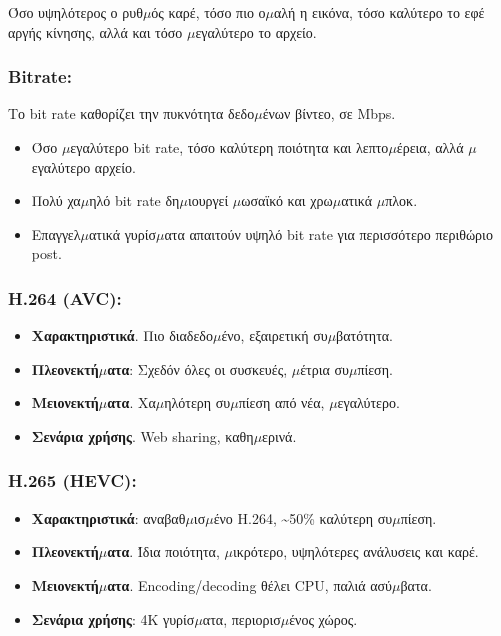 Όσο υψηλότερος ο ρυθ$\mu$ός καρέ, τόσο πιο ο$\mu$αλή η εικόνα, τόσο καλύτερο το εφέ αργής κίνησης, αλλά και τόσο $\mu$εγαλύτερο το αρχείο.

\subsubsection*{Bitrate:}

Το bit rate καθορίζει την πυκνότητα δεδο$\mu$ένων βίντεο, σε Mbps.

\begin{itemize}
  \item Όσο $\mu$εγαλύτερο bit rate, τόσο καλύτερη ποιότητα και λεπτο$\mu$έρεια, αλλά $\mu$εγαλύτερο αρχείο.
  \item Πολύ χα$\mu$ηλό bit rate δη$\mu$ιουργεί $\mu$ωσαϊκό και χρω$\mu$ατικά $\mu$πλοκ.
  \item Επαγγελ$\mu$ατικά γυρίσ$\mu$ατα απαιτούν υψηλό bit rate για περισσότερο περιθώριο post.
\end{itemize}


\subsubsection*{H.264 (AVC):}

\begin{itemize}
  \item \textbf{Χαρακτηριστικά}. Πιο διαδεδο$\mu$ένο, εξαιρετική συ$\mu$βατότητα.
  \item \textbf{Πλεονεκτή$\mu$ατα}: Σχεδόν όλες οι συσκευές, $\mu$έτρια συ$\mu$πίεση.
  \item \textbf{Μειονεκτή$\mu$ατα}. Χα$\mu$ηλότερη συ$\mu$πίεση από νέα, $\mu$εγαλύτερο.
  \item \textbf{Σενάρια χρήσης}. Web sharing, καθη$\mu$ερινά.
\end{itemize}

\subsubsection*{H.265 (HEVC):}

\begin{itemize}
  \item \textbf{Χαρακτηριστικά}: αναβαθ$\mu$ισ$\mu$ένο H.264, \textasciitilde{}50\% καλύτερη συ$\mu$πίεση.
  \item \textbf{Πλεονεκτή$\mu$ατα}. Ίδια ποιότητα, $\mu$ικρότερο, υψηλότερες ανάλυσεις και καρέ.
  \item \textbf{Μειονεκτή$\mu$ατα}. Encoding/decoding θέλει CPU, παλιά ασύ$\mu$βατα.
  \item \textbf{Σενάρια χρήσης}: 4K γυρίσ$\mu$ατα, περιορισ$\mu$ένος χώρος.
\end{itemize}

